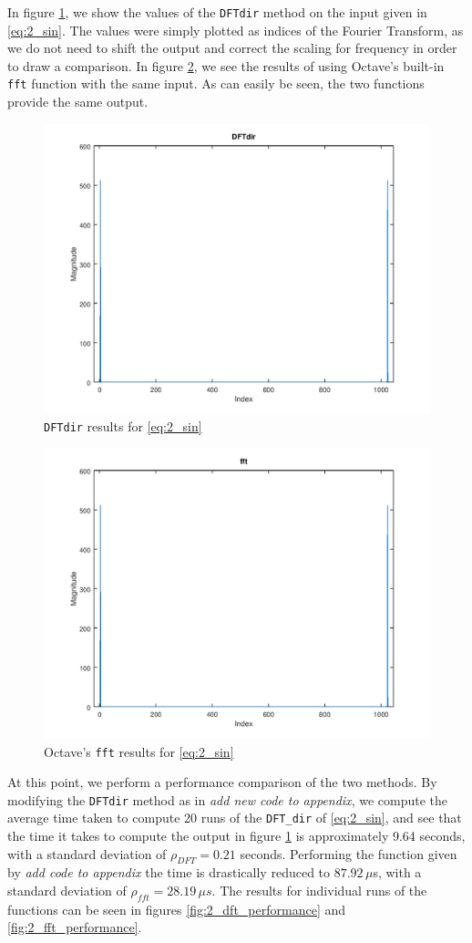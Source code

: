 \documentclass[a4paper, 12pt]{report}
\begin{document}
			In figure \ref{fig:2_dft}, we show the values of the \texttt{DFTdir} method on the input given in \eqref{eq:2_sin}. The values were simply plotted as indices of the Fourier Transform, as we do not need to shift the output and correct the scaling for frequency in order to draw a comparison. In figure \ref{fig:2_fft}, we see the results of using Octave's built-in \texttt{fft} function with the same input. As can easily be seen, the two functions provide the same output.

			\begin{figure}[H]
				\centering
				\includegraphics[width=.7\textwidth]{img/2_1.png}
				\caption{\texttt{DFTdir} results for \eqref{eq:2_sin}}
				\label{fig:2_dft}
			\end{figure}

			\begin{figure}[H]
				\centering
				\includegraphics[width=.7\textwidth]{img/2_2.png}
				\caption{Octave's \texttt{fft} results for \eqref{eq:2_sin}}
				\label{fig:2_fft}
			\end{figure}

			At this point, we perform a performance comparison of the two methods. By modifying the \texttt{DFTdir} method as in \textit{add new code to appendix}, we compute the average time taken to compute 20 runs of the \texttt{DFT\_dir} of \eqref{eq:2_sin}, and see that the time it takes to compute the output in figure \ref{fig:2_dft} is approximately 9.64 seconds, with a standard deviation of $\rho_{DFT} = 0.21$ seconds. Performing the function given by \textit{add code to appendix} the time is drastically reduced to $87.92 \,\mu$s, with a standard deviation of $\rho_{fft} = 28.19 \,\mu s$. The results for individual runs of the functions can be seen in figures \ref{fig:2_dft_performance} and \ref{fig:2_fft_performance}.
\end{document}
